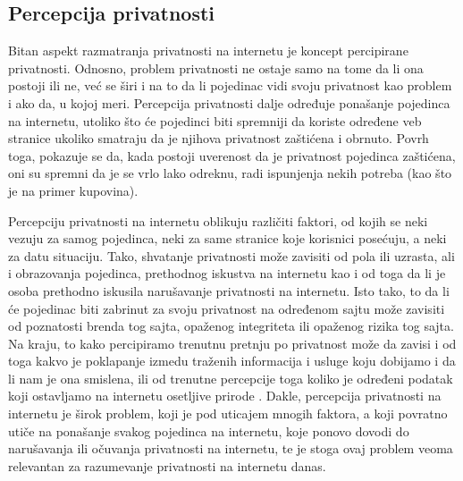 \documentclass[a4paper]{article}
\begin{document}
\subsection{Percepcija privatnosti}
\label{subsec:percepcija}
Bitan aspekt razmatranja privatnosti na internetu je koncept percipirane privatnosti. Odnosno, problem privatnosti ne ostaje samo na tome da li ona postoji ili ne,  već se širi i na to da li pojedinac vidi svoju privatnost kao problem i ako da, u kojoj meri. Percepcija privatnosti dalje određuje ponašanje pojedinca na internetu,  utoliko što će pojedinci biti spremniji da koriste određene veb stranice ukoliko smatraju da je njihova privatnost zaštićena i obrnuto. Povrh toga, pokazuje se da, kada postoji uverenost da je privatnost pojedinca zaštićena, oni su spremni da je se vrlo lako odreknu, radi ispunjenja nekih potreba (kao što je na primer kupovina).
\par Percepciju privatnosti na internetu oblikuju različiti faktori, od kojih se neki vezuju za samog pojedinca, neki za same stranice koje korisnici posećuju, a neki  za datu situaciju. Tako, shvatanje privatnosti može zavisiti od pola ili uzrasta, ali i obrazovanja pojedinca, prethodnog iskustva na internetu kao i od toga da li je  osoba prethodno iskusila narušavanje privatnosti na internetu. Isto tako, to da li će pojedinac biti zabrinut za svoju privatnost na određenom sajtu može zavisiti od poznatosti brenda tog sajta, opaženog integriteta ili opaženog rizika tog sajta. Na kraju, to kako percipiramo trenutnu pretnju po privatnost može da zavisi i od toga kakvo je poklapanje izmedu traženih informacija i usluge koju dobijamo i da li nam je ona smislena, ili od trenutne percepcije toga koliko je određeni podatak koji ostavljamo na internetu osetljive prirode \cite{renata}. Dakle, percepcija privatnosti na internetu je širok problem, koji je pod uticajem mnogih faktora, a koji povratno utiče na ponašanje svakog pojedinca na internetu, koje ponovo dovodi do narušavanja ili očuvanja privatnosti na internetu, te je stoga ovaj problem veoma relevantan za razumevanje privatnosti na internetu danas.  
\end{document}

